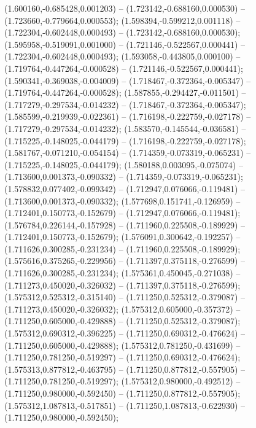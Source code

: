 (1.600160,-0.685428,0.001203) -- (1.723142,-0.688160,0.000530) -- (1.723660,-0.779664,0.000553);
 (1.598394,-0.599212,0.001118) -- (1.722304,-0.602448,0.000493) -- (1.723142,-0.688160,0.000530);
 (1.595958,-0.519091,0.001000) -- (1.721146,-0.522567,0.000441) -- (1.722304,-0.602448,0.000493);
 (1.593058,-0.443805,0.000100) -- (1.719764,-0.447264,-0.000528) -- (1.721146,-0.522567,0.000441);
 (1.590341,-0.369038,-0.004009) -- (1.718467,-0.372364,-0.005347) -- (1.719764,-0.447264,-0.000528);
 (1.587855,-0.294427,-0.011501) -- (1.717279,-0.297534,-0.014232) -- (1.718467,-0.372364,-0.005347);
 (1.585599,-0.219939,-0.022361) -- (1.716198,-0.222759,-0.027178) -- (1.717279,-0.297534,-0.014232);
 (1.583570,-0.145544,-0.036581) -- (1.715225,-0.148025,-0.044179) -- (1.716198,-0.222759,-0.027178);
 (1.581767,-0.071210,-0.054154) -- (1.714359,-0.073319,-0.065231) -- (1.715225,-0.148025,-0.044179);
 (1.580188,0.003095,-0.075074) -- (1.713600,0.001373,-0.090332) -- (1.714359,-0.073319,-0.065231);
 (1.578832,0.077402,-0.099342) -- (1.712947,0.076066,-0.119481) -- (1.713600,0.001373,-0.090332);
 (1.577698,0.151741,-0.126959) -- (1.712401,0.150773,-0.152679) -- (1.712947,0.076066,-0.119481);
 (1.576784,0.226144,-0.157928) -- (1.711960,0.225508,-0.189929) -- (1.712401,0.150773,-0.152679);
 (1.576091,0.300642,-0.192257) -- (1.711626,0.300285,-0.231234) -- (1.711960,0.225508,-0.189929);
 (1.575616,0.375265,-0.229956) -- (1.711397,0.375118,-0.276599) -- (1.711626,0.300285,-0.231234);
 (1.575361,0.450045,-0.271038) -- (1.711273,0.450020,-0.326032) -- (1.711397,0.375118,-0.276599);
 (1.575312,0.525312,-0.315140) -- (1.711250,0.525312,-0.379087) -- (1.711273,0.450020,-0.326032);
 (1.575312,0.605000,-0.357372) -- (1.711250,0.605000,-0.429888) -- (1.711250,0.525312,-0.379087);
 (1.575312,0.690312,-0.396225) -- (1.711250,0.690312,-0.476624) -- (1.711250,0.605000,-0.429888);
 (1.575312,0.781250,-0.431699) -- (1.711250,0.781250,-0.519297) -- (1.711250,0.690312,-0.476624);
 (1.575313,0.877812,-0.463795) -- (1.711250,0.877812,-0.557905) -- (1.711250,0.781250,-0.519297);
 (1.575312,0.980000,-0.492512) -- (1.711250,0.980000,-0.592450) -- (1.711250,0.877812,-0.557905);
 (1.575312,1.087813,-0.517851) -- (1.711250,1.087813,-0.622930) -- (1.711250,0.980000,-0.592450);
